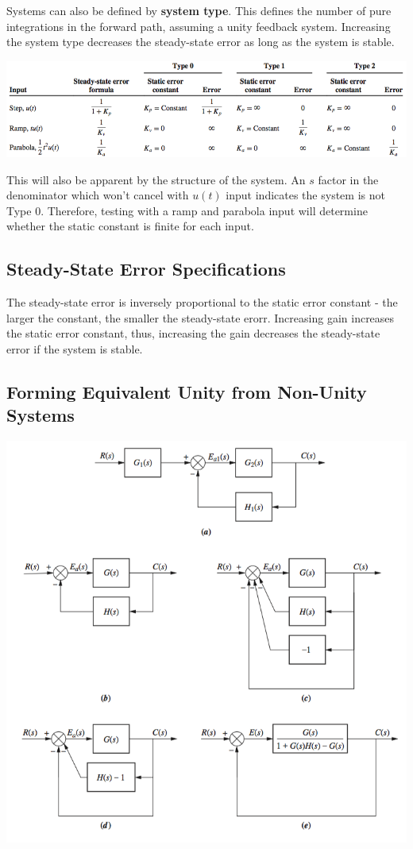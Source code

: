 \documentclass[11pt]{article}
\begin{document}
    Systems can also be defined by \textbf{system type}. This defines the number of pure integrations in the forward path, assuming a unity feedback system. Increasing the system type decreases the steady-state error as long as the system is stable.

    \begin{center}
        \includegraphics[width=300 px]{img/types} \\
    \end{center}

    This will also be apparent by the structure of the system. An $s$ factor in the denominator which won't cancel with $u(t)$ input indicates the system is not Type 0. Therefore, testing with a ramp and parabola input will determine whether the static constant is finite for each input.

    \subsection{Steady-State Error Specifications}

   The steady-state error is inversely proportional to the static error constant - the larger the constant, the smaller the steady-state erorr. Increasing gain increases the static error constant, thus, increasing the gain decreases the steady-state error if the system is stable.

   \subsection{Forming Equivalent Unity from Non-Unity Systems}

   \begin{center}
    \includegraphics[width=300 px]{img/nonunity} \\
    \end{center}
\end{document}
